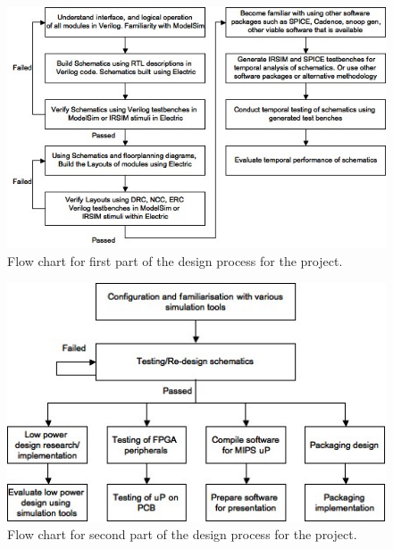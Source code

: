 \begin{figure}
\centering 
\includegraphics[width=\textwidth]{designflowA.jpg}
\caption{Flow chart for first part of the design process for the project.}
\label{designflowA}
\end{figure}

\begin{figure}
\centering 
\includegraphics[width=\textwidth]{designflowB.jpg}
\caption{Flow chart for second part of the design process for the project.}
\label{designflowB}
\end{figure}
